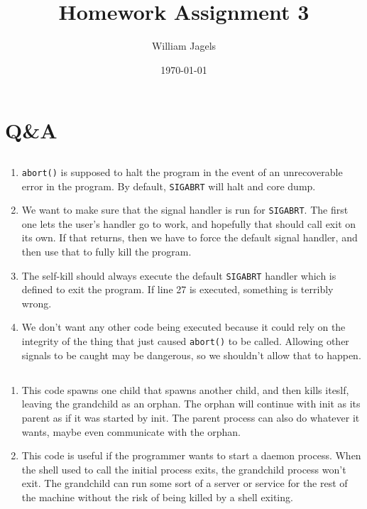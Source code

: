 \documentclass[a4paper,11pt]{article}
\title{Homework Assignment 3}
\author{William Jagels}
\date{\today}
\def\code#1{\texttt{#1}}
\begin{document}
\maketitle

\section{Q\&A}

\subsection{}
\begin{enumerate}
  \item \code{abort()} is supposed to halt the program in the event of an unrecoverable
    error in the program.
    By default, \code{SIGABRT} will halt and core dump.
  \item We want to make sure that the signal handler is run for \code{SIGABRT}.
    The first one lets the user's handler go to work, and hopefully that should call
    exit on its own.
    If that returns, then we have to force the default signal handler, and then use that
    to fully kill the program.
  \item The self-kill should always execute the default \code{SIGABRT} handler which
    is defined to exit the program.
    If line 27 is executed, something is terribly wrong.
  \item We don't want any other code being executed because it could rely on the integrity
    of the thing that just caused \code{abort()} to be called.
    Allowing other signals to be caught may be dangerous, so we shouldn't allow that to happen.
\end{enumerate}

\subsection{}
\begin{enumerate}
  \item This code spawns one child that spawns another child, and then kills iteslf, leaving
    the grandchild as an orphan.
    The orphan will continue with init as its parent as if it was started by init.
    The parent process can also do whatever it wants, maybe even communicate with the orphan.
  \item This code is useful if the programmer wants to start a daemon process.
    When the shell used to call the initial process exits, the grandchild process won't exit.
    The grandchild can run some sort of a server or service for the rest of the machine without
    the risk of being killed by a shell exiting.
\end{enumerate}
\end{document}
